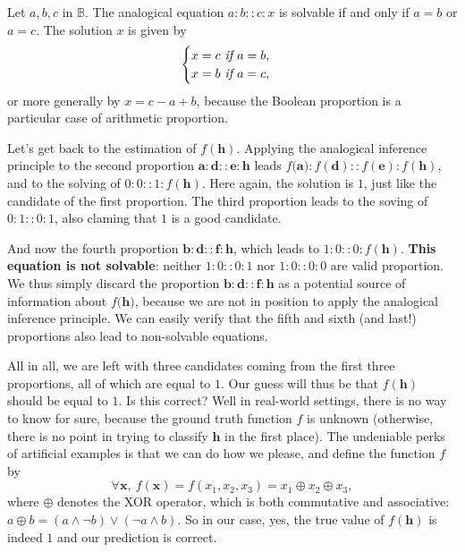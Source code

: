 \begin{proposition}
  Let $a, b, c$ in $\mathbb{B}$. The analogical equation
  $a :b::c:x$
  is solvable if and only if $a = b$ or $a = c$. The solution $x$ is given by
  $$
  \begin{cases}
    x = c \emph{ if } a = b,\\
    x = b \emph{ if } a = c,
  \end{cases}
  $$
  or more generally by $x = c - a + b$, because the Boolean proportion is a
  particular case of arithmetic proportion.
\end{proposition}

Let's get back to the estimation of $f(\mathbf{h})$. Applying the analogical
inference principle to the second proportion $\mathbf{a} : \mathbf{d} ::
\mathbf{e} : \mathbf{h}$ leads $f(\mathbf{a)} : f(\mathbf{d}) :: f(\mathbf{e})
: f(\mathbf{h})$, and to the solving of $0:0::1:f(\mathbf{h})$. Here again, the
solution is $1$, just like the candidate of the first proportion.
The third proportion leads to the soving of $0:1::0:1$, also claming that $1$
is a good candidate.

And now the fourth proportion $\mathbf{b} : \mathbf{d} :: \mathbf{f} :
\mathbf{h}$, which leads to $1:0::0:f(\mathbf{h})$. \textbf{This equation is not
solvable}: neither $1:0::0:1$ nor $1:0::0:0$ are valid proportion. We thus
simply discard the proportion $\mathbf{b} : \mathbf{d} :: \mathbf{f} :
\mathbf{h}$ as a potential source of information about $f(\mathbf{h)}$, because
we are not in position to apply the analogical inference principle. We can
easily verify that the fifth and sixth (and last!) proportions also lead to
non-solvable equations.

All in all, we are left with three candidates coming from the first three
proportions, all of which are equal to $1$. Our guess will thus be that
$f(\mathbf{h})$ should be equal to $1$. Is this correct? Well in real-world
settings, there is no way to know for sure, because the ground truth function
$f$ is unknown (otherwise, there is no point in trying to classify $\mathbf{h}$
in the first place). The undeniable perks of artificial examples is that we can
do how we please, and define the function $f$ by
$$\forall \mathbf{x}, ~ f(\mathbf{x}) = f(x_1, x_2, x_3) = x_1 \oplus x_2 \oplus x_3,$$
where $\oplus$ denotes the XOR operator, which is both commutative and
associative: $a \oplus b = (a \wedge \neg b) \vee (\neg a \wedge b)$. So in our
case, yes, the true value of $f(\mathbf{h})$ is indeed $1$ and our prediction
is correct.

